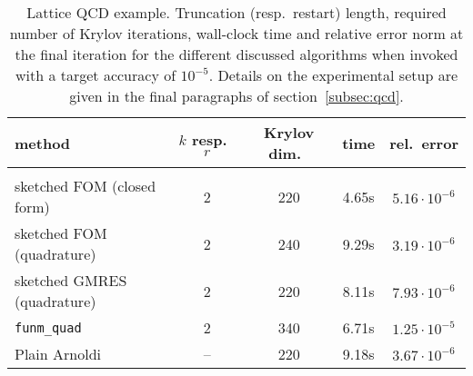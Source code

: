 \begin{table}
\centering
\caption{Lattice QCD example. Truncation (resp.\ restart) length, required number of Krylov iterations, wall-clock time and relative error norm at the final iteration for the different discussed algorithms when invoked with a target accuracy of $10^{-5}$. Details on the experimental setup are given in the final paragraphs of section~\ref{subsec:qcd}.}
\label{tab:qcd}
\begin{tabular}{l|cccc}
method & $k$ resp.\ $r$ & Krylov dim.\ & time & rel.\ error \\[1mm]
\hline\hline\\[-2mm]
sketched FOM (closed form) & 2 & 220 & 4.65s & $5.16 \cdot 10^{-6}$ \\
sketched FOM (quadrature) & 2 & 240 & 9.29s & $3.19 \cdot 10^{-6}$ \\
sketched GMRES (quadrature) & 2 & 220 & 8.11s & $7.93 \cdot 10^{-6}$ \\
\texttt{funm\_quad} &  2 & 340 & 6.71s & $1.25 \cdot 10^{-5}$ \\
Plain Arnoldi & -- & 220 & 9.18s & $3.67 \cdot 10^{-6}$ \\
\end{tabular}
\end{table}
